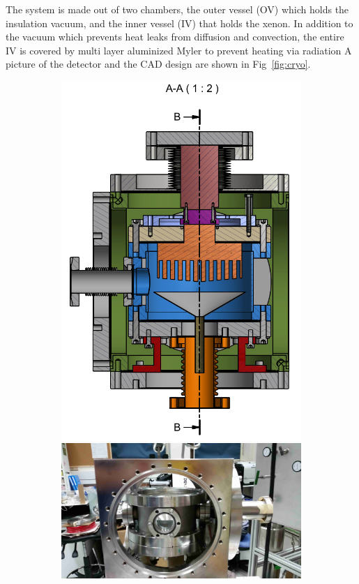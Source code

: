 The system is made out of two chambers, the outer vessel (OV) which holds the insulation vacuum, and the inner vessel (IV) that holds the xenon. In addition to the vacuum which prevents heat leaks from diffusion and convection, the entire IV is covered by multi layer aluminized Myler to prevent heating via radiation A picture of the detector and the CAD design are shown in Fig~\ref{fig:cryo}. 
\begin{figure}
   \centering
    \begin{subfigure}[b]{0.25\textheight}
    \includegraphics[width=\textwidth]{cryogenic1.png}
    \includegraphics[width=\textwidth]{CryoOpen_small.jpg}

\end{subfigure}
\end{figure}
